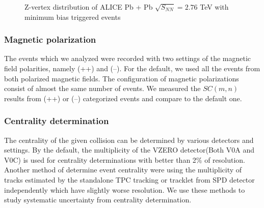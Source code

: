  	\begin{figure}[h]
		\begin{center}
        \caption{Z-vertex distribution of ALICE Pb + Pb $\sqrt{S_{NN}} = 2.76 $ TeV with minimum bias triggered events }
        \label{fig:zvtx}
        \end{center}   
     \end{figure}


	
\subsubsection{Magnetic polarization}
	The events which we analyzed were recorded with two settings of the magnetic field polarities, namely (++) and  (--). For the default, we used all the events from both polarized magnetic fields. The configuration of magnetic polarizations consist of almost the same number of events. We measured the $SC(m,n)$ results from (++) or (--) categorized events and compare to the default one.
	
\subsubsection{Centrality determination}
	The centrality of the given collision can be determined by various detectors and settings. By the default, the multiplicity of the VZERO detector(Both V0A and V0C) is used for centrality determinations with better than 2\% of resolution. Another method of determine event centrality were using the multiplicity of tracks estimated by the standalone TPC tracking or tracklet from SPD detector independently which have slightly worse resolution. We use these methods to study systematic uncertainty from centrality determination.
	
